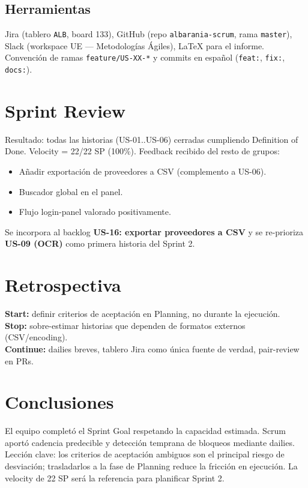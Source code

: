 \documentclass[11pt,a4paper]{article}
\begin{document}
\subsection{Herramientas}
Jira (tablero \texttt{ALB}, board 133), GitHub (repo \texttt{albarania-scrum}, rama \texttt{master}), Slack (workspace UE — Metodologías Ágiles), LaTeX para el informe. Convención de ramas \texttt{feature/US-XX-*} y commits en español (\texttt{feat:}, \texttt{fix:}, \texttt{docs:}).

\section{Sprint Review}
Resultado: todas las historias (US-01..US-06) cerradas cumpliendo Definition of Done. Velocity = 22/22 SP (100\%). Feedback recibido del resto de grupos:
\begin{itemize}
\item Añadir exportación de proveedores a CSV (complemento a US-06).
\item Buscador global en el panel.
\item Flujo login-panel valorado positivamente.
\end{itemize}
Se incorpora al backlog \textbf{US-16: exportar proveedores a CSV} y se re-prioriza \textbf{US-09 (OCR)} como primera historia del Sprint 2.

\section{Retrospectiva}
\textbf{Start:} definir criterios de aceptación en Planning, no durante la ejecución.\\
\textbf{Stop:} sobre-estimar historias que dependen de formatos externos (CSV/encoding).\\
\textbf{Continue:} dailies breves, tablero Jira como única fuente de verdad, pair-review en PRs.

\section{Conclusiones}
El equipo completó el Sprint Goal respetando la capacidad estimada. Scrum aportó cadencia predecible y detección temprana de bloqueos mediante dailies. Lección clave: los criterios de aceptación ambiguos son el principal riesgo de desviación; trasladarlos a la fase de Planning reduce la fricción en ejecución. La velocity de 22 SP será la referencia para planificar Sprint 2.
\end{document}
